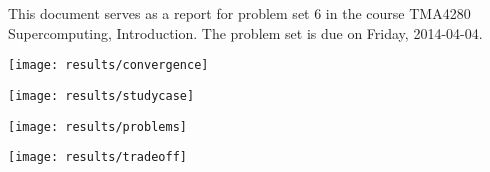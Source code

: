 \documentclass[12pt]{simple-assignment} %
\begin{document}
\noindent
This document serves as a report for problem set 6 in the course TMA4280 Supercomputing, Introduction. The problem set is due on Friday, 2014-04-04.

\noindent
\texttt{[image: results/convergence]}

\noindent
\texttt{[image: results/studycase]}

\noindent
\texttt{[image: results/problems]}

\noindent
\texttt{[image: results/tradeoff]}
\end{document}
